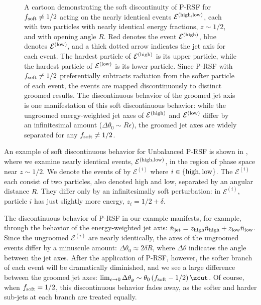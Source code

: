 \documentclass[letterpaper,11pt]{article}
\begin{document}
\begin{figure}[t!]
{
}
\caption{
A cartoon demonstrating the soft discontinuity of P-RSF for \(f_{\rm soft} \neq 1/2\) acting on the nearly identical events \(\mathcal E^{(\rm high, low)}\), each with two particles with nearly identical energy fractions, \(z \sim 1/2\), and with opening angle \(R\).
%
Red denotes the event \(\mathcal E^{(\rm high)}\), blue denotes \(\mathcal E^{(\rm low)}\), and a thick dotted arrow indicates the jet axis for each event.
%
The hardest particle of \(\mathcal E^{(\rm high)}\) is its upper particle, while the hardest particle of \(\mathcal E^{(\rm low)}\) is its lower particle.
%
Since P-RSF with \(f_{\rm soft} \neq 1/2\) preferentially subtracts radiation from the softer particle of each event, the events are mapped discontinuously to distinct groomed results.
%
The discontinuous behavior of the groomed jet axis is one manifestation of this soft discontinuous behavior:
%
while the ungroomed energy-weighted jet axes of \(\mathcal E^{(\rm high)}\) and \(\mathcal E^{(\rm low)}\) differ by an infinitesimal amount (\(\Delta\theta_0 \sim R \epsilon\)), the groomed jet axes are widely separated for any \(f_{\rm soft} \neq 1/2\).
}
\label{fig:rsf_discont}
\end{figure}

An example of soft discontinuous behavior for Unbalanced P-RSF is shown in , where we examine nearly identical events, \(\mathcal{E}^{(\rm high, low)}\), in the region of phase space near \(z \sim 1/2\).
%
We denote the events of  by \(\mathcal{E}^{(i)}\) where \(i \in \{{\rm high, low}\}\).
%
The \(\mathcal E^{(i)}\) each consist of two particles, also denoted high and low, separated by an angular distance \(R\).
%
They differ only by an infinitesimally soft perturbation:
%
in \(\mathcal{E}^{(i)}\), particle \(i\) has just slightly more energy, \(z_i = 1/2 + \delta\).

The discontinuous behavior of P-RSF in our example manifests, for example, through the behavior of the energy-weighted jet axis:
%
\(\hat n_{\rm jet} = z_{\rm high} \hat n_{\rm high} +  z_{\rm low} \hat n_{\rm low}\).
%
Since the ungroomed \(\mathcal{E}^{(i)}\) are nearly identically, the axes of the ungroomed events differ by a minuscule amount:
%
\(\Delta\theta_{0} \approx 2\delta R\), where \(\Delta \theta\) indicates the angle between the jet axes.
%
After the application of P-RSF, however, the softer branch of each event will be dramatically diminished, and we see a large difference between the groomed jet axes:
%
\(\lim_{\epsilon\to 0}\Delta \theta_{g} \sim \theta_0\,(f_{\rm soft} - 1/2)\,\zcut\).
%
Of course, when \(f_{\rm soft} = 1/2\), this discontinuous behavior fades away, as the softer and harder sub-jets at each branch are treated equally.
\end{document}
